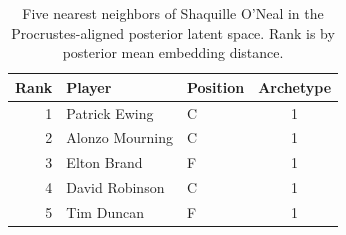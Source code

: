 \begin{table}[htbp]
  \centering\small
  \begin{tabular}{rllc}
    \toprule
    Rank & Player & Position & Archetype \\
    \midrule
    1 & Patrick Ewing & C & 1 \\
    2 & Alonzo Mourning & C & 1 \\
    3 & Elton Brand & F & 1 \\
    4 & David Robinson & C & 1 \\
    5 & Tim Duncan & F & 1 \\
    \bottomrule
  \end{tabular}
  \caption{Five nearest neighbors of Shaquille O'Neal in the Procrustes-aligned posterior latent space. Rank is by posterior mean embedding distance.}
  \label{tab:Shaquille_O_Neal_neighbors}
\end{table}


